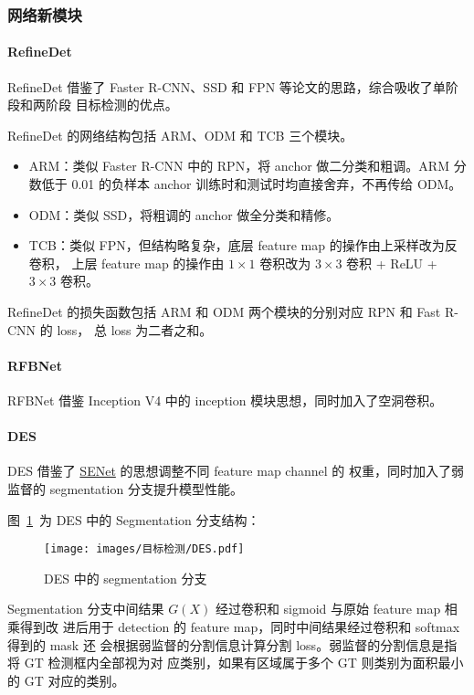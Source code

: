 \subsubsection{网络新模块}
\paragraph{RefineDet}
RefineDet 借鉴了 Faster R-CNN、SSD 和 FPN 等论文的思路，综合吸收了单阶段和两阶段
目标检测的优点。

RefineDet 的网络结构包括 ARM、ODM 和 TCB 三个模块。
\begin{itemize}
  \item ARM：类似 Faster R-CNN 中的 RPN，将 anchor 做二分类和粗调。ARM 分数低于
    0.01 的负样本 anchor 训练时和测试时均直接舍弃，不再传给 ODM。
  \item ODM：类似 SSD，将粗调的 anchor 做全分类和精修。
  \item TCB：类似 FPN，但结构略复杂，底层 feature map 的操作由上采样改为反卷积，
    上层 feature map 的操作由 $1 \times 1$ 卷积改为 $3 \times 3$ 卷积 + ReLU +
    $3 \times 3$ 卷积。
\end{itemize}

RefineDet 的损失函数包括 ARM 和 ODM 两个模块的分别对应 RPN 和 Fast R-CNN 的 loss，
总 loss 为二者之和。

\paragraph{RFBNet}
RFBNet 借鉴 Inception V4 中的 inception 模块思想，同时加入了空洞卷积。

\paragraph{DES}
DES 借鉴了 \hyperref[subsec:SENet]{SENet} 的思想调整不同 feature map channel 的
权重，同时加入了弱监督的 segmentation 分支提升模型性能。

图~\ref{fig:des-seg}~为 DES 中的 Segmentation 分支结构：

\begin{figure}[ht]
  \centering
  \texttt{[image: images/目标检测/DES.pdf]}
  \caption{DES 中的 segmentation 分支}
  \label{fig:des-seg}
\end{figure}

Segmentation 分支中间结果 $G(X)$ 经过卷积和 sigmoid 与原始 feature map 相乘得到改
进后用于 detection 的 feature map，同时中间结果经过卷积和 softmax 得到的 mask 还
会根据弱监督的分割信息计算分割 loss。弱监督的分割信息是指将 GT 检测框内全部视为对
应类别，如果有区域属于多个 GT 则类别为面积最小的 GT 对应的类别。

